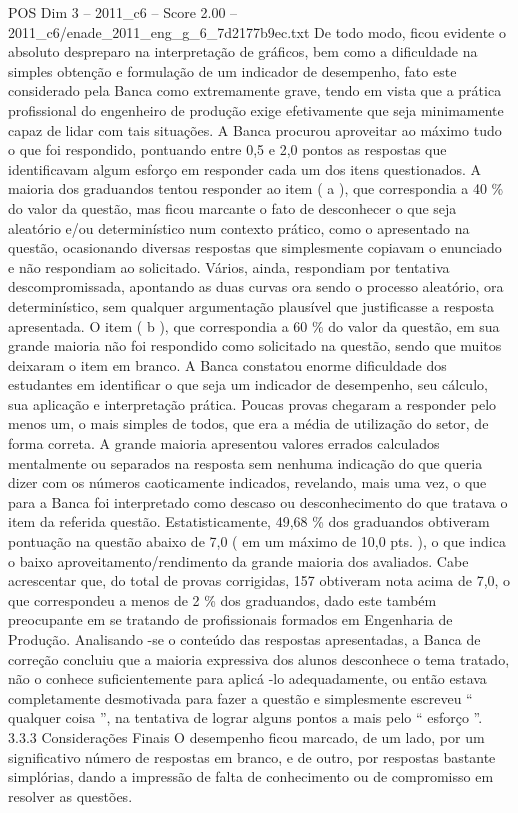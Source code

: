 \begin{textsample}{POS Dim 3 – 2011\_c6 – Score 2.00 – 2011\_c6/enade\_2011\_eng\_g\_6\_7d2177b9ec.txt}
De todo modo, ficou evidente o absoluto despreparo na interpretação de gráficos, bem como a dificuldade na simples obtenção e formulação de um indicador de desempenho, fato este considerado pela Banca como extremamente grave, tendo em vista que a prática profissional do engenheiro de produção exige efetivamente que seja minimamente capaz de lidar com tais situações.
A Banca procurou aproveitar ao máximo tudo o que foi respondido, pontuando entre 0,5 e 2,0 pontos as respostas que identificavam algum esforço em responder cada um dos itens questionados.
A maioria dos graduandos tentou responder ao item ( a ), que correspondia a 40 \% do valor da questão, mas ficou marcante o fato de desconhecer o que seja aleatório e/ou determinístico num contexto prático, como o apresentado na questão, ocasionando diversas respostas que simplesmente copiavam o enunciado e não respondiam ao solicitado.
Vários, ainda, respondiam por tentativa descompromissada, apontando as duas curvas ora sendo o processo aleatório, ora determinístico, sem qualquer argumentação plausível que justificasse a resposta apresentada.
O item ( b ), que correspondia a 60 \% do valor da questão, em sua grande maioria não foi respondido como solicitado na questão, sendo que muitos deixaram o item em branco.
A Banca constatou enorme dificuldade dos estudantes em identificar o que seja um indicador de desempenho, seu cálculo, sua aplicação e interpretação prática.
Poucas provas chegaram a responder pelo menos um, o mais simples de todos, que era a média de utilização do setor, de forma correta.
A grande maioria apresentou valores errados calculados mentalmente ou separados na resposta sem nenhuma indicação do que queria dizer com os números caoticamente indicados, revelando, mais uma vez, o que para a Banca foi interpretado como descaso ou desconhecimento do que tratava o item da referida questão.
Estatisticamente, 49,68 \% dos graduandos obtiveram pontuação na questão abaixo de 7,0 ( em um máximo de 10,0 pts. ), o que indica o baixo aproveitamento/rendimento da grande maioria dos avaliados.
Cabe acrescentar que, do total de provas corrigidas, 157 obtiveram nota acima de 7,0, o que correspondeu a menos de 2 \% dos graduandos, dado este também preocupante em se tratando de profissionais formados em Engenharia de Produção.
Analisando -se o conteúdo das respostas apresentadas, a Banca de correção concluiu que a maioria expressiva dos alunos desconhece o tema tratado, não o conhece suficientemente para aplicá -lo adequadamente, ou então estava completamente desmotivada para fazer a questão e simplesmente escreveu “ qualquer coisa ”, na tentativa de lograr alguns pontos a mais pelo “ esforço ”. 3.3.3 Considerações Finais O desempenho ficou marcado, de um lado, por um significativo número de respostas em branco, e de outro, por respostas bastante simplórias, dando a impressão de falta de conhecimento ou de compromisso em resolver as questões.

\end{textsample}
